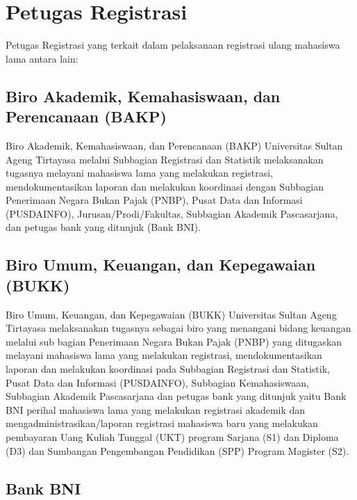 \documentclass[
]{book}
\begin{document}
\hypertarget{petugas-registrasi}{%
\section{Petugas Registrasi}\label{petugas-registrasi}}

Petugas Registrasi yang terkait dalam pelaksanaan registrasi ulang mahasiswa lama antara lain:

\hypertarget{biro-akademik-kemahasiswaan-dan-perencanaan-bakp}{%
\subsection{Biro Akademik, Kemahasiswaan, dan Perencanaan (BAKP)}\label{biro-akademik-kemahasiswaan-dan-perencanaan-bakp}}

Biro Akademik, Kemahasiswaan, dan Perencanaan (BAKP) Universitas Sultan Ageng Tirtayasa melalui Subbagian Registrasi dan Statistik melaksanakan tugasnya melayani mahasiswa lama yang melakukan registrasi, mendokumentasikan laporan dan melakukan koordinasi dengan Subbagian Penerimaan Negara Bukan Pajak (PNBP), Pusat Data dan Informasi (PUSDAINFO), Jurusan/Prodi/Fakultas, Subbagian Akademik Pascasarjana, dan petugas bank yang ditunjuk (Bank BNI).

\hypertarget{biro-umum-keuangan-dan-kepegawaian-bukk}{%
\subsection{Biro Umum, Keuangan, dan Kepegawaian (BUKK)}\label{biro-umum-keuangan-dan-kepegawaian-bukk}}

Biro Umum, Keuangan, dan Kepegawaian (BUKK) Universitas Sultan Ageng Tirtayasa melaksanakan tugasnya sebagai biro yang menangani bidang keuangan melalui sub bagian Penerimaan Negara Bukan Pajak (PNBP) yang ditugaskan melayani mahasiswa lama yang melakukan registrasi, mendokumentasikan laporan dan melakukan koordinasi pada Subbagian Registrasi dan Statistik, Pusat Data dan Informasi (PUSDAINFO), Subbagian Kemahasiswaan, Subbagian Akademik Pascasarjana dan petugas bank yang ditunjuk yaitu Bank BNI perihal mahasiswa lama yang melakukan registrasi akademik dan mengadministrasikan/laporan registrasi mahasiswa baru yang melakukan pembayaran Uang Kuliah Tunggal (UKT) program Sarjana (S1) dan Diploma (D3) dan Sumbangan Pengembangan Pendidikan (SPP) Program Magister (S2).

\hypertarget{bank-bni}{%
\subsection{Bank BNI}\label{bank-bni}}
\end{document}
